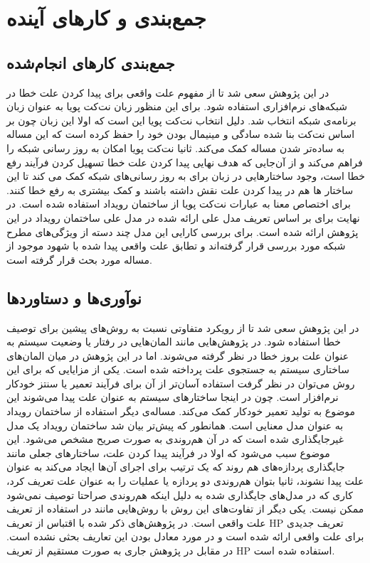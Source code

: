 \chapter{جمع‌بندی و کار‌های آینده}
\section{جمع‌بندی کار‌های انجام‌شده}
در این پژوهش سعی شد تا از مفهوم علت واقعی برای پیدا کردن علت خطا در شبکه‌های نرم‌افزاری استفاده شود.
برای این منظور زبان نت‌کت پویا به عنوان زبان برنامه‌ی‌ شبکه‌ انتخاب شد.
دلیل انتخاب نت‌کت پویا این است که اولا این زبان چون بر اساس نت‌کت بنا شده سادگی و مینیمال بودن خود را حفظ کرده است که این مساله به ساده‌تر شدن مساله کمک می‌کند.
ثانیا نت‌کت پویا امکان به روز‌ رسانی شبکه را فراهم می‌کند و از آن‌جایی که هدف نهایی پیدا کردن علت خطا تسهیل کردن فرآیند رفع خطا است، وجود ساختارهایی در زبان برای به روز رسانی‌های شبکه کمک می کند تا این ساختار ها هم در پیدا کردن علت نقش داشته باشند و کمک بیشتری به رفع خطا کنند.
 برای اختصاص معنا به عبارات نت‌کت پویا از ساختمان رویداد استفاده شده است.
 در نهایت برای بر اساس تعریف مدل علی ارائه شده در
 \cite{hp}
 مدل علی ساختمان رویداد در این پژوهش ارائه شده است.
 برای بررسی کارایی این مدل چند دسته از ویژگی‌های مطرح شبکه مورد بررسی قرار گرفته‌اند و تطابق علت واقعی پیدا شده با شهود موجود از مساله مورد بحث قرار گرفته است.

 \section{نوآوری‌ها و دستاورد‌ها}
در این پژوهش سعی شد تا از رویکرد متفاوتی نسبت به روش‌های پیشین برای توصیف خطا استفاده شود.
در پژوهش‌هایی مانند
\cite{causality-checking,causal-hml,chockler}
المان‌هایی در رفتار یا وضعیت سیستم به عنوان علت بروز خطا در نظر گرفته می‌شوند.
اما در این پژوهش در میان المان‌های ساختاری سیستم به جستجوی علت پرداخته شده است.
یکی از مزایایی که برای این روش می‌توان در نظر گرفت استفاده آسان‌تر از آن برای فرآیند تعمیر یا سنتز خودکار نرم‌افزار است. 
چون در اینجا ساختار‌های سیستم به عنوان علت پیدا می‌شوند این موضوع به تولید تعمیر خودکار کمک می‌کند.
مساله‌ی دیگر استفاده از ساختمان رویداد به عنوان مدل معنایی است.
همانطور که پیش‌تر بیان شد ساختمان رویداد یک مدل غیرجایگذاری شده است که در آن هم‌روندی به صورت صریح مشخص می‌شود.
این موضوع سبب می‌شود که اولا در فرآیند پیدا کردن علت، ساختار‌های جعلی مانند جایگذاری پردازه‌های هم روند که یک ترتیب برای اجرای آن‌ها ایجاد می‌کند به عنوان علت پیدا نشوند، ثانیا بتوان هم‌روندی دو پردازه یا عملیات را به عنوان علت تعریف کرد، کاری که در مدل‌های جایگذاری شده به دلیل اینکه هم‌روندی صراحتا توصیف نمی‌شود ممکن نیست.
یکی دیگر از تفاوت‌های این روش با روش‌هایی مانند
\cite{causal-hml,causality-checking}
در استفاده از تعریف علت واقعی است.
در پژوهش‌های ذکر شده با اقتباس از تعریف
HP
تعریف جدیدی برای علت واقعی ارائه شده است و در مورد معادل بودن این تعاریف بحثی نشده است.
در مقابل در پژوهش جاری به صورت مستقیم از تعریف 
HP
استفاده شده است.

